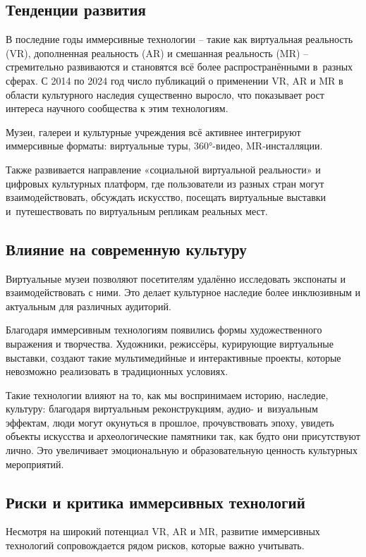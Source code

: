 \documentclass{ou}
\begin{document}
\subsection{Тенденции развития}
В последние годы иммерсивные технологии -- такие как виртуальная реальность (VR), дополненная реальность (AR) и смешанная реальность (MR) -- стремительно развиваются и становятся всё более распространёнными в~разных сферах. С 2014 по 2024 год число публикаций о применении VR, AR и MR в области культурного наследия существенно выросло, что показывает рост интереса научного сообщества к этим технологиям\cite{koh_impact_2024}. 

Музеи, галереи и культурные учреждения всё активнее интегрируют иммерсивные форматы: виртуальные туры, 360°-видео, MR-инсталляции. 

Также развивается направление «социальной виртуальной реальности» и цифровых культурных платформ, где пользователи из разных стран могут взаимодействовать, обсуждать искусство, посещать виртуальные выставки и~путешествовать по виртуальным репликам реальных мест.
\subsection{Влияние на современную культуру}
Виртуальные музеи позволяют посетителям удалённо исследовать экспонаты и взаимодействовать с ними. Это делает культурное наследие более инклюзивным и актуальным для различных аудиторий.  

Благодаря иммерсивным технологиям появились формы художественного выражения и творчества. Художники, режиссёры, курирующие виртуальные выставки, создают такие мультимедийные и интерактивные проекты, которые невозможно реализовать в традиционных условиях. 

Такие технологии влияют на то, как мы воспринимаем историю, наследие, культуру: благодаря виртуальным реконструкциям, аудио- и~визуальным эффектам, люди могут окунуться в прошлое, прочувствовать эпоху, увидеть объекты искусства и археологические памятники так, как будто они присутствуют лично. Это увеличивает эмоциональную и образовательную ценность культурных мероприятий\cite{ng_cultural_2025}.
\subsection{Риски и критика иммерсивных технологий}
Несмотря на широкий потенциал VR, AR и MR, развитие иммерсивных технологий сопровождается рядом рисков, которые важно учитывать.
\end{document}

